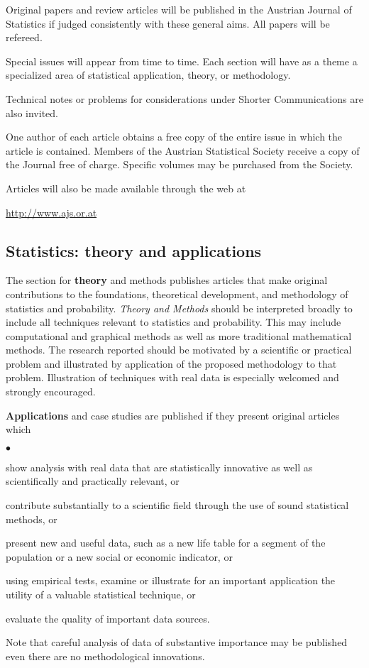 \documentclass[article]{ajs}
\begin{document}
Original papers and review articles will be published in the
Austrian Journal of Statistics if judged consistently with these
general aims. All papers will be refereed.

Special issues will appear from time to time. Each
section will have as a theme a specialized area of statistical
application, theory, or methodology.

Technical notes or problems for considerations under Shorter
Communications are also invited.

One author of each article obtains a free copy of the entire issue
in which the article is contained. Members of the Austrian
Statistical Society receive a copy of the Journal free of charge.
Specific volumes may be purchased from the Society.

Articles will also be made available through the web at 
\begin{center}
\href{http://www.ajs.or.at}{http://www.ajs.or.at}
\end{center}


\subsection{Statistics: theory and applications}

The section for {\bf theory} and methods publishes articles that
make original contributions to the foundations, theoretical
development, and methodology of statistics and probability. {\em
Theory and Methods\/} should be interpreted broadly to include all
techniques relevant to statistics and probability. This may
include computational and graphical methods as well as more
traditional mathematical methods. The research reported should be
motivated by a scientific or practical problem and illustrated by
application of the proposed methodology to that problem.
Illustration of techniques with real data is especially welcomed
and strongly encouraged.
\medskip

{\bf Applications} and case studies are published if they present
original articles which
\begin{list}{$\bullet$}{\setlength{\topsep}{0mm}\setlength{\itemsep}{-1mm}}
 \item show analysis with real data that are statistically
       innovative as well as scientifically and practically relevant, or
 \item contribute substantially to a scientific field through the
       use of sound statistical methods, or
 \item present new and useful data, such as a new life table for
       a segment of the population or a new social or economic
       indicator, or
 \item using empirical tests, examine or illustrate for an important
       application the utility of a valuable statistical technique, or
 \item evaluate the quality of important data sources.
\end{list}
Note that careful analysis of data of substantive importance may be
published even there are no methodological innovations.
\end{document}
